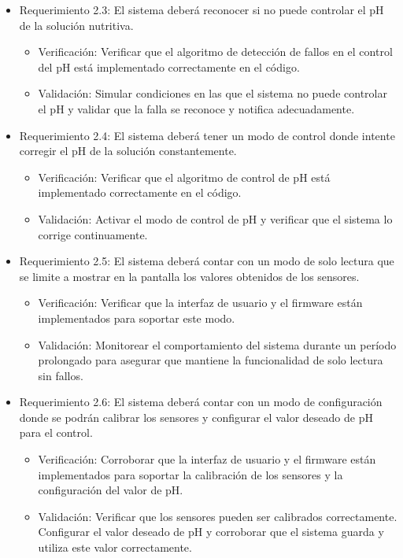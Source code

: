\documentclass[
11pt, %
codirector, %
]{charter}
\begin{document}
\begin{itemize}
\item Requerimiento 2.3: El sistema deberá reconocer si no puede controlar el pH de la solución nutritiva.

\begin{itemize}
	\item Verificación: Verificar que el algoritmo de detección de fallos en el control del pH está implementado correctamente en el código.
	\item Validación: Simular condiciones en las que el sistema no puede controlar el pH y validar que la falla se reconoce y notifica adecuadamente.
\end{itemize}

\item Requerimiento 2.4: El sistema deberá tener un modo de control donde intente corregir el pH de la solución constantemente.

\begin{itemize}
	\item Verificación: Verificar que el algoritmo de control de pH está implementado correctamente en el código.
	\item Validación: Activar el modo de control de pH y verificar que el sistema lo corrige continuamente.
\end{itemize}

\item Requerimiento 2.5: El sistema deberá contar con un modo de solo lectura que se limite a mostrar en la pantalla los valores obtenidos de los sensores.

\begin{itemize}
	\item Verificación: Verificar que la interfaz de usuario y el firmware están implementados para soportar este modo.
	\item Validación: Monitorear el comportamiento del sistema durante un período prolongado para asegurar que mantiene la funcionalidad de solo lectura sin fallos.
\end{itemize}

\item Requerimiento 2.6: El sistema deberá contar con un modo de configuración donde se podrán calibrar los sensores y configurar el valor deseado de pH para el control.

\begin{itemize}
	\item Verificación: Corroborar que la interfaz de usuario y el firmware están implementados para soportar la calibración de los sensores y la configuración del valor de pH.
	\item Validación: Verificar que los sensores pueden ser calibrados correctamente. Configurar el valor deseado de pH y corroborar que el sistema guarda y utiliza este valor correctamente.
\end{itemize}


\end{itemize}
\end{document}
